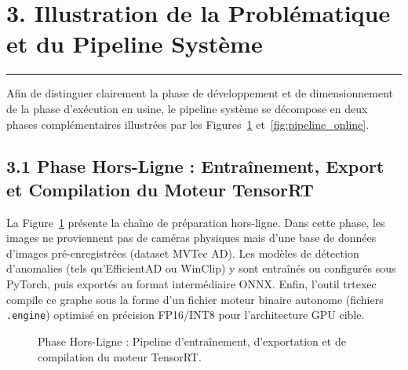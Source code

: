 \documentclass[11pt,a4paper]{article}
\begin{document}
\section*{\color{darkBlue} 3. Illustration de la Problématique et du Pipeline Système}
\hrule
\vspace{0.2cm}

Afin de distinguer clairement la phase de développement et de dimensionnement de la phase d'exécution en usine, le pipeline système se décompose en deux phases complémentaires illustrées par les Figures~\ref{fig:pipeline_offline} et~\ref{fig:pipeline_online}.

\subsection*{\color{darkBlue} 3.1 Phase Hors-Ligne : Entraînement, Export et Compilation du Moteur TensorRT}

La Figure~\ref{fig:pipeline_offline} présente la chaîne de préparation hors-ligne. Dans cette phase, les images ne proviennent pas de caméras physiques mais d'une base de données d'images pré-enregistrées (dataset MVTec AD). Les modèles de détection d'anomalies (tels qu'EfficientAD ou WinClip) y sont entraînés ou configurés sous PyTorch, puis exportés au format intermédiaire ONNX. Enfin, l'outil trtexec compile ce graphe sous la forme d'un fichier moteur binaire autonome (fichiers \texttt{.engine}) optimisé en précision FP16/INT8 pour l'architecture GPU cible.

\begin{figure}[h!]
\centering
{}
\caption{Phase Hors-Ligne : Pipeline d'entraînement, d'exportation et de compilation du moteur TensorRT.}
\label{fig:pipeline_offline}
\end{figure}
\end{document}
